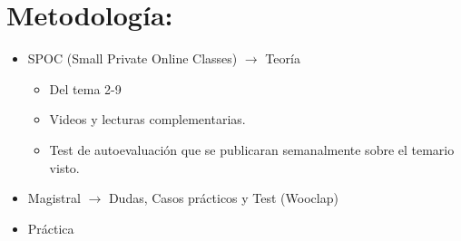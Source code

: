 \documentclass[12pt, twoside, openright]{report} %
\begin{document}
\section{Metodología:}
\begin{itemize}
	\item SPOC (Small Private Online Classes) $\rightarrow$ Teoría
	      \begin{itemize}
		      \item Del tema 2-9
		      \item Videos y lecturas complementarias.
		      \item Test de autoevaluación que se publicaran semanalmente sobre el temario visto.
	      \end{itemize}
	\item Magistral $\rightarrow$ Dudas, Casos prácticos y Test (Wooclap)
	\item Práctica
\end{itemize}
\end{document}
